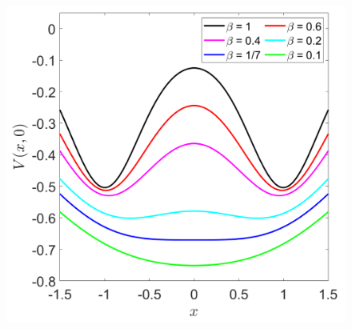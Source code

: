 \documentclass[10pt,aps,onecolumn,superscriptaddress]{revtex4-2}
\begin{document}
\begin{figure}
    \centering
    \includegraphics[scale=0.36]{pitcfork_bif_c_1div2_a_1_d_1}
    \caption{}
    \label{fig:pitchfork_bif}
\end{figure}



\end{document}
